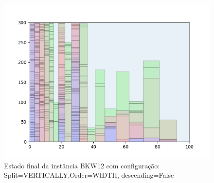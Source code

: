 \begin{figure}[H]
    \centering
    \caption[]{Estado final da instância BKW12 com configuração: Split=VERTICALLY,Order=WIDTH, descending=False}
    \label{fig:bkw12-vertically-width-false}
    \includegraphics[scale=0.5]{output/figures/bkw/bkw12/vertically/width/false/000}
\end{figure}